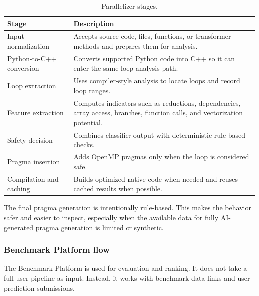 \documentclass[12pt,a4paper]{report}
\newcommand{\acceleraTableStyle}{%
\small
\renewcommand{\arraystretch}{1.15}
\setlength{\tabcolsep}{4pt}%
}
\begin{document}
\begin{table}[!htbp]
\centering
\acceleraTableStyle
\caption{Parallelizer stages.}
\label{tab:parallelizer-stages}
\begin{tabularx}{\textwidth}{p{}X}
\toprule
\textbf{Stage} & \textbf{Description} \\
\midrule

Input normalization &
Accepts source code, files, functions, or transformer methods and prepares them
for analysis. \\
\midrule

Python-to-C++ conversion &
Converts supported Python code into C++ so it can enter the same loop-analysis
path. \\
\midrule

Loop extraction &
Uses compiler-style analysis to locate loops and record loop ranges. \\
\midrule

Feature extraction &
Computes indicators such as reductions, dependencies, array access, branches,
function calls, and vectorization potential. \\
\midrule

Safety decision &
Combines classifier output with deterministic rule-based checks. \\
\midrule

Pragma insertion &
Adds OpenMP pragmas only when the loop is considered safe. \\
\midrule

Compilation and caching &
Builds optimized native code when needed and reuses cached results when
possible. \\

\bottomrule
\end{tabularx}
\end{table}

The final pragma generation is intentionally rule-based. This makes the behavior
safer and easier to inspect, especially when the available data for fully
AI-generated pragma generation is limited or synthetic.

\subsubsection*{Benchmark Platform flow}

The Benchmark Platform is used for evaluation and ranking. It does not take a
full user pipeline as input. Instead, it works with benchmark data links and user
prediction submissions.
\end{document}
